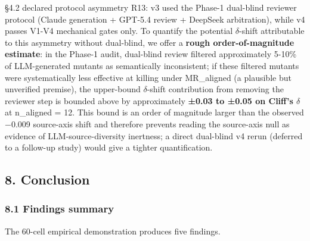 \documentclass[review,12pt,authoryear]{elsarticle}
\begin{document}
§4.2 declared protocol asymmetry R13: v3 used the Phase-1 dual-blind
reviewer protocol (Claude generation + GPT-5.4 review + DeepSeek
arbitration), while v4 passes V1-V4 mechanical gates only. To quantify
the potential $\delta$-shift attributable to this asymmetry without dual-blind,
we offer a \textbf{rough order-of-magnitude estimate}: in the Phase-1
audit, dual-blind review filtered approximately 5-10\% of LLM-generated
mutants as semantically inconsistent; if these filtered mutants were
systematically less effective at killing under MR\_aligned (a plausible
but unverified premise), the upper-bound $\delta$-shift contribution from
removing the reviewer step is bounded above by approximately
\textbf{±0.03 to ±0.05 on Cliff's $\delta$} at n\_aligned = 12. This bound is
an order of magnitude larger than the observed −0.009 source-axis shift
and therefore prevents reading the source-axis null as evidence of
LLM-source-diversity inertness; a direct dual-blind v4 rerun (deferred
to a follow-up study) would give a tighter quantification.


\subsection{8. Conclusion}\label{conclusion}

\subsubsection{8.1 Findings summary}\label{findings-summary}

The 60-cell empirical demonstration produces five findings.
\end{document}

